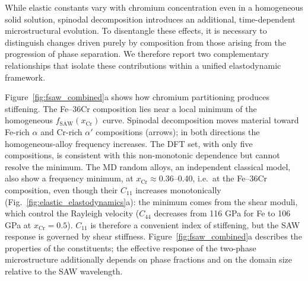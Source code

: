 \documentclass[final,3p,times]{elsarticle}
\begin{document}
While elastic constants vary with chromium concentration even in a homogeneous solid solution, spinodal decomposition introduces an additional, time-dependent microstructural evolution. To disentangle these effects, it is necessary to distinguish changes driven purely by composition from those arising from the progression of phase separation. We therefore report two complementary relationships that isolate these contributions within a unified elastodynamic framework.

Figure~\ref{fig:fsaw_combined}a shows how chromium partitioning produces stiffening. The Fe--36Cr composition lies near a local minimum of the homogeneous $f_{\mathrm{SAW}}(x_{\mathrm{Cr}})$ curve. Spinodal decomposition moves material toward Fe-rich $\alpha$ and Cr-rich $\alpha'$ compositions (arrows); in both directions the homogeneous-alloy frequency increases. The DFT set, with only five compositions, is consistent with this non-monotonic dependence but cannot resolve the minimum. The MD random alloys, an independent classical model, also show a frequency minimum, at $x_{\mathrm{Cr}}\approx0.36$--0.40, i.e.\ at the Fe--36Cr composition, even though their $C_{11}$ increases monotonically (Fig.~\ref{fig:elastic_elastodynamics}a): the minimum comes from the shear moduli, which control the Rayleigh velocity ($C_{44}$ decreases from 116 GPa for Fe to 106 GPa at $x_{\mathrm{Cr}}=0.5$). $C_{11}$ is therefore a convenient index of stiffening, but the SAW response is governed by shear stiffness. Figure~\ref{fig:fsaw_combined}a describes the properties of the constituents; the effective response of the two-phase microstructure additionally depends on phase fractions and on the domain size relative to the SAW wavelength.
\end{document}

